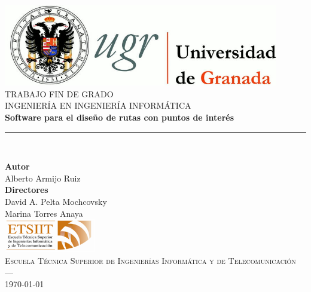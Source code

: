 \begin{titlepage}
\newlength{\centeroffset}
\setlength{\centeroffset}{-0.5\oddsidemargin}
\addtolength{\centeroffset}{0.5\evensidemargin}
\thispagestyle{empty}

\noindent\hspace*{\centeroffset}\begin{minipage}{\textwidth}

\centering
\includegraphics[width=0.9\textwidth]{imagenes/logo_ugr.jpg}\\[1.4cm]

\textsc{ \Large TRABAJO FIN DE GRADO\\[0.2cm]}
\textsc{ INGENIERÍA EN INGENIERÍA INFORMÁTICA}\\[1cm]
% 
{\Huge\bfseries Software para el diseño de rutas con 
	puntos de interés\\
}
\noindent\rule[-1ex]{\textwidth}{3pt}\\[3.5ex]
{\large\bfseries }
\end{minipage}

\vspace{1cm}
\noindent\hspace*{\centeroffset}\begin{minipage}{\textwidth}
\centering

\textbf{Autor}\\ {Alberto Armijo Ruiz}\\[2.5ex]
\textbf{Directores}\\
{David A. Pelta Mochcovsky\\
 Marina Torres Anaya}\\[2cm]
\includegraphics[width=0.3\textwidth]{imagenes/etsiit_logo.png}\\[0.1cm]
\textsc{Escuela Técnica Superior de Ingenierías Informática y de Telecomunicación}\\
\textsc{---}\\
\today
\end{minipage}
\end{titlepage}


